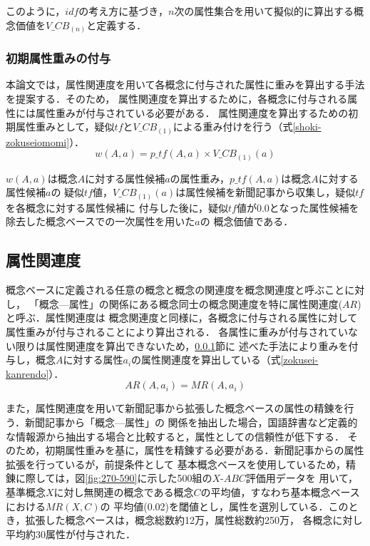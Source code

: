 \documentclass[japanese]{jnlp_1.3e}
\begin{document}
このように，$\mathit{idf}$の考え方に基づき，$n$次の属性集合を用いて擬似的に算出する概念価値を$V\_\mathit{CB}_{(n)}$と定義する．

\subsubsection{初期属性重みの付与} \label{shoki-omomi}

本論文では，属性関連度を用いて各概念に付与された属性に重みを算出する手法を提案する．そのため，
属性関連度を算出するために，各概念に付与される属性には属性重みが付与されている必要がある．
属性関連度を算出するための初期属性重みとして，疑似$\mathit{tf}$と$V\_\mathit{CB}_{(1)}$による重み付けを行う（式\ref{shoki-zokuseiomomi}）．
\begin{equation}
 w(A,a)=p\_ \mathit{tf}(A,a)\times V\_\mathit{CB}_{(1)}(a) \label{shoki-zokuseiomomi}
\end{equation}

$w(A,a)$は概念$A$に対する属性候補$a$の属性重み，$p\_\mathit{tf}(A,a)$は概念$A$に対する属性候補$a$の
疑似$\mathit{tf}$値，$V\_\mathit{CB}_{(1)}(a)$は属性候補を新聞記事から収集し，疑似$\mathit{tf}$を各概念に対する属性候補に
付与した後に，疑似$\mathit{tf}$値が0.0となった属性候補を除去した概念ベースでの一次属性を用いた$a$の
概念価値である．

\subsection{属性関連度} \label{kinji-shinraido}

概念ベースに定義される任意の概念と概念の関連度を概念関連度と呼ぶことに対し，
「概念—属性」の関係にある概念同士の概念関連度を特に属性関連度($\mathit{AR}$)と呼ぶ．属性関連度は
概念関連度と同様に，各概念に付与される属性に対して属性重みが付与されることにより算出される．
各属性に重みが付与されていない限りは属性関連度を算出できないため，\ref{shoki-omomi}節に
述べた手法により重みを付与し，概念$A$に対する属性$a_i$の属性関連度を算出している（式\ref{zokusei-kanrendo}）．
\begin{equation}
\mathit{AR}(A,a_i) = \mathit{MR}(A,a_i) \label{zokusei-kanrendo}
\end{equation}

また，属性関連度を用いて新聞記事から拡張した概念ベースの属性の精錬を行う．新聞記事から「概念—属性」の
関係を抽出した場合，国語辞書など定義的な情報源から抽出する場合と比較すると，属性としての信頼性が低下する．
そのため，初期属性重みを基に，属性を精錬する必要がある．新聞記事からの属性拡張を行っているが，前提条件として
基本概念ベースを使用しているため，精錬に際しては，図\ref{fig:270-590}に示した500組の$X$-$\mathit{ABC}$評価用データを
用いて，基準概念$X$に対し無関連の概念である概念$C$の平均値，すなわち基本概念ベースにおける$\mathit{MR}(X,C)$の
平均値(0.02)を閾値とし，属性を選別している．このとき，拡張した概念ベースは，概念総数約12万，属性総数約250万，
各概念に対し平均約30属性が付与された．
\end{document}
